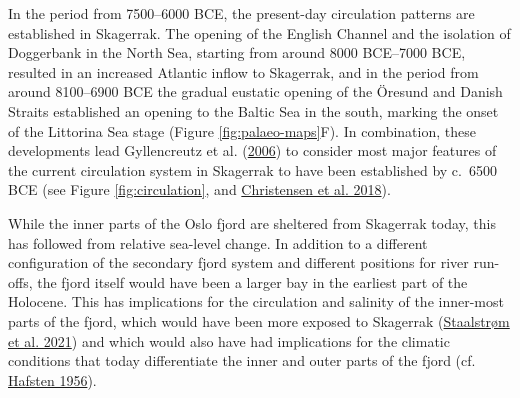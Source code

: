 \documentclass[
  12pt,
  a4paper,
  oneside]{book}
\begin{document}
In the period from 7500--6000 BCE, the present-day circulation patterns are established in Skagerrak. The opening of the English Channel and the isolation of Doggerbank in the North Sea, starting from around 8000 BCE--7000 BCE, resulted in an increased Atlantic inflow to Skagerrak, and in the period from around 8100--6900 BCE the gradual eustatic opening of the Öresund and Danish Straits established an opening to the Baltic Sea in the south, marking the onset of the Littorina Sea stage (Figure \ref{fig:palaeo-maps}F). In combination, these developments lead Gyllencreutz et al. (\protect\hyperlink{ref-gyllencreutz2006}{2006}) to consider most major features of the current circulation system in Skagerrak to have been established by c.~6500 BCE (see Figure \ref{fig:circulation}, and \protect\hyperlink{ref-christensen2018}{Christensen et al. 2018}).

While the inner parts of the Oslo fjord are sheltered from Skagerrak today, this has followed from relative sea-level change. In addition to a different configuration of the secondary fjord system and different positions for river run-offs, the fjord itself would have been a larger bay in the earliest part of the Holocene. This has implications for the circulation and salinity of the inner-most parts of the fjord, which would have been more exposed to Skagerrak (\protect\hyperlink{ref-staalstruxf8m2021}{Staalstrøm et al. 2021}) and which would also have had implications for the climatic conditions that today differentiate the inner and outer parts of the fjord (cf. \protect\hyperlink{ref-hafsten1956}{Hafsten 1956}).
\end{document}
